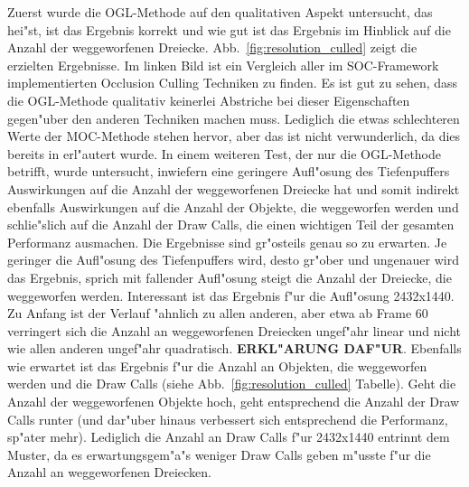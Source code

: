 \documentclass[journal]{vgtc}
\begin{document}
Zuerst wurde die OGL-Methode auf den qualitativen Aspekt untersucht, das hei"st, ist das Ergebnis korrekt und wie \glqq gut\grqq{} ist das Ergebnis im Hinblick auf die Anzahl der weggeworfenen Dreiecke. Abb.\ \ref{fig:resolution_culled} zeigt die erzielten Ergebnisse. Im linken Bild ist ein Vergleich aller im SOC-Framework implementierten Occlusion Culling Techniken zu finden. Es ist gut zu sehen, dass die OGL-Methode qualitativ keinerlei Abstriche bei dieser Eigenschaften gegen"uber den anderen Techniken machen muss. Lediglich die etwas schlechteren Werte der MOC-Methode stehen hervor, aber das ist nicht verwunderlich, da dies bereits in \cite{MSOC} erl"autert wurde. In einem weiteren Test, der nur die OGL-Methode betrifft, wurde untersucht, inwiefern eine geringere Aufl"osung des Tiefenpuffers Auswirkungen auf die Anzahl der weggeworfenen Dreiecke hat und somit indirekt ebenfalls Auswirkungen auf die Anzahl der Objekte, die weggeworfen werden und schlie"slich auf die Anzahl der Draw Calls, die einen wichtigen Teil der gesamten Performanz ausmachen. Die Ergebnisse sind gr"osteils genau so zu erwarten. Je geringer die Aufl"osung des Tiefenpuffers wird, desto gr"ober und ungenauer wird das Ergebnis, sprich mit fallender Aufl"osung steigt die Anzahl der Dreiecke, die weggeworfen werden. Interessant ist das Ergebnis f"ur die Aufl"osung 2432x1440. Zu Anfang ist der Verlauf "ahnlich zu allen anderen, aber etwa ab Frame 60 verringert sich die Anzahl an weggeworfenen Dreiecken ungef"ahr linear und nicht wie allen anderen ungef"ahr quadratisch. \textbf{ERKL"ARUNG DAF"UR}. Ebenfalls wie erwartet ist das Ergebnis f"ur die Anzahl an Objekten, die weggeworfen werden und die Draw Calls (siehe Abb.\ \ref{fig:resolution_culled} Tabelle). Geht die Anzahl der weggeworfenen Objekte hoch, geht entsprechend die Anzahl der Draw Calls runter (und dar"uber hinaus verbessert sich entsprechend die Performanz, sp"ater mehr). Lediglich die Anzahl an Draw Calls f"ur 2432x1440 entrinnt dem Muster, da es erwartungsgem"a"s weniger Draw Calls geben m"usste f"ur die Anzahl an weggeworfenen Dreiecken.\\
\end{document}
